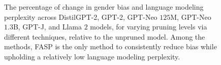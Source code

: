 \documentclass[letterpaper]{article} %
\newcommand{\goncalo}[1]
{\textcolor{orange}{{\bf}{\em #1}{\bf}}}
\begin{document}
\begin{figure}[t]
        \caption{The percentage of change in gender bias and language modeling perplexity across DistilGPT-2, GPT-2, GPT-Neo $125$M, GPT-Neo $1.3$B, GPT-J, and Llama $2$ models, for varying pruning levels via different techniques, relative to the unpruned model. Among the methods, FASP is the only method to consistently reduce bias while upholding a relatively low language modeling perplexity.}
        \label{fig:gender_bias_pruning}
\end{figure}
\end{document}
